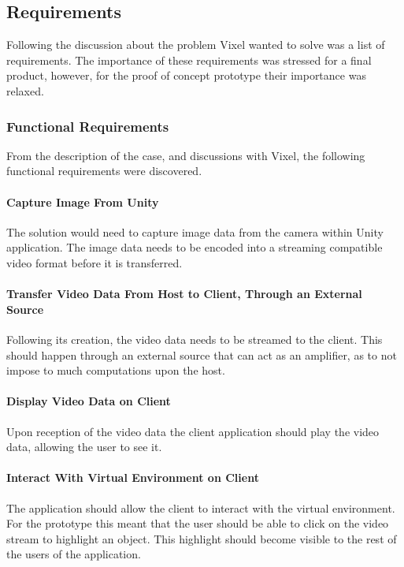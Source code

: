 \subsection{Requirements}
Following the discussion about the problem Vixel wanted to solve was a list of requirements. The importance of these requirements was stressed for a final product, however, for the proof of concept prototype their importance was relaxed. 

\subsubsection{Functional Requirements}
From the description of the case, and discussions with Vixel, the following functional requirements were discovered.

\paragraph{Capture Image From Unity}
The solution would need to capture image data from the camera within Unity application. The image data needs to be encoded into a streaming compatible video format before it is transferred.

\paragraph{Transfer Video Data From Host to Client, Through an External Source}
Following its creation, the video data needs to be streamed to the client. This should happen through an external source that can act as an amplifier, as to not impose to much computations upon the host.

\paragraph{Display Video Data on Client}
Upon reception of the video data the client application should play the video data, allowing the user to see it. 

\paragraph{Interact With Virtual Environment on Client}
The application should allow the client to interact with the virtual environment. For the prototype this meant that the user should be able to click on the video stream to highlight an object. This highlight should become visible to the rest of the users of the application.

